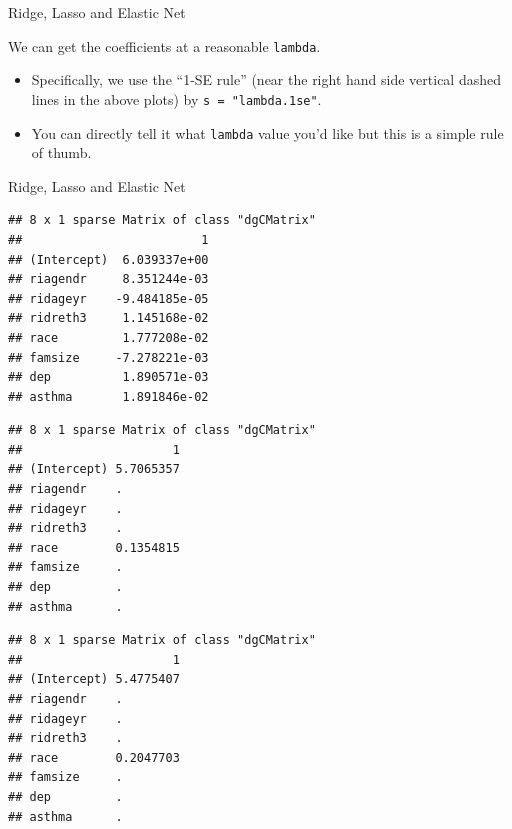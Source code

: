\begin{frame}[fragile]{Ridge, Lasso and Elastic Net}

We can get the coefficients at a reasonable \texttt{lambda}.

\begin{itemize}
\tightlist
\item
  Specifically, we use the ``1-SE rule'' (near the right hand side
  vertical dashed lines in the above plots) by
  \texttt{s\ =\ "lambda.1se"}.
\item
  You can directly tell it what \texttt{lambda} value you'd like but
  this is a simple rule of thumb.
\end{itemize}

\begin{Shaded}
\begin{Highlighting}[]
 \NormalTok{)}
 \NormalTok{)}
 \NormalTok{)}
\end{Highlighting}
\end{Shaded}

\end{frame}

\begin{frame}[fragile]{Ridge, Lasso and Elastic Net}

\tiny

\begin{verbatim}
## 8 x 1 sparse Matrix of class "dgCMatrix"
##                         1
## (Intercept)  6.039337e+00
## riagendr     8.351244e-03
## ridageyr    -9.484185e-05
## ridreth3     1.145168e-02
## race         1.777208e-02
## famsize     -7.278221e-03
## dep          1.890571e-03
## asthma       1.891846e-02
\end{verbatim}

\begin{verbatim}
## 8 x 1 sparse Matrix of class "dgCMatrix"
##                     1
## (Intercept) 5.7065357
## riagendr    .        
## ridageyr    .        
## ridreth3    .        
## race        0.1354815
## famsize     .        
## dep         .        
## asthma      .
\end{verbatim}

\begin{verbatim}
## 8 x 1 sparse Matrix of class "dgCMatrix"
##                     1
## (Intercept) 5.4775407
## riagendr    .        
## ridageyr    .        
## ridreth3    .        
## race        0.2047703
## famsize     .        
## dep         .        
## asthma      .
\end{verbatim}

\end{frame}

